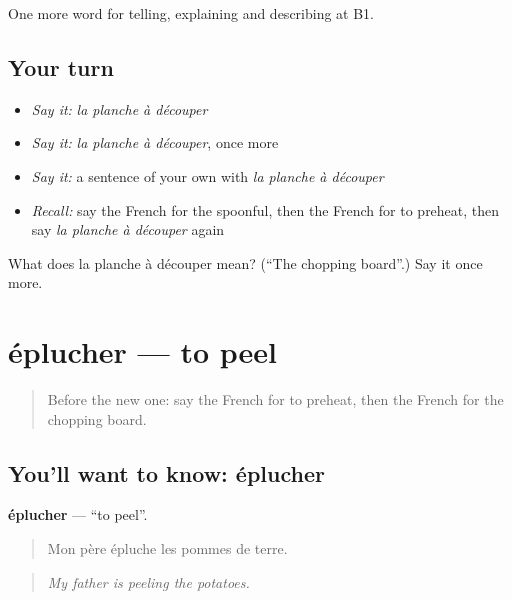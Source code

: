 \begin{grammarlens}[title={What you've built}]
One more word for telling, explaining and describing at B1.
\end{grammarlens}

\subsection*{Your turn}
\begin{itemize}
\raggedright
  \item \emph{Say it:} \emph{la planche à découper}
  \item \emph{Say it:} \emph{la planche à découper}, once more
  \item \emph{Say it:} a sentence of your own with \emph{la planche à découper}
  \item \emph{Recall:} say the French for the spoonful, then the French for to preheat, then say \emph{la planche à découper} again
\end{itemize}

\begin{tcolorbox}[breakable,colback=teal!4,colframe=teal!35!black,title={Before you move on}]
What does la planche à découper mean? (\textquotedblleft{}The chopping board\textquotedblright{}.) Say it once more.
\end{tcolorbox}
\section[éplucher]{éplucher — to peel}

\label{lesson:FR-C328-eplucher}



\begin{quote}
Before the new one: say the French for to preheat, then the French for the chopping board.
\end{quote}

\subsection*{You'll want to know: éplucher}
\textbf{éplucher} — \textquotedblleft{}to peel\textquotedblright{}.

\begin{quote}
Mon père épluche les pommes de terre.
\end{quote}

\begin{quote}
\emph{My father is peeling the potatoes.}
\end{quote}

